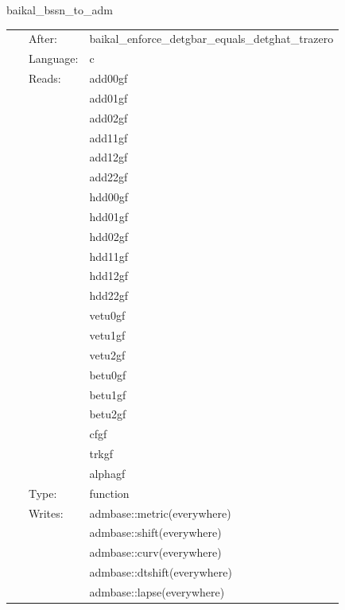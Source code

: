 \vspace{5mm}


\hspace{5mm} baikal\_bssn\_to\_adm 

\hspace{5mm}{\it perform bssn-to-adm conversion in mol\_pseudoevolution. needed for proper hydrobase integration. } 


\hspace{5mm}

 \begin{tabular*}{160mm}{cll} 
~ & After:  & baikal\_enforce\_detgbar\_equals\_detghat\_trazero \\ 
~ & Language:  & c \\ 
~ & Reads:  & add00gf \\ 
~& ~ &add01gf\\ 
~& ~ &add02gf\\ 
~& ~ &add11gf\\ 
~& ~ &add12gf\\ 
~& ~ &add22gf\\ 
~& ~ &hdd00gf\\ 
~& ~ &hdd01gf\\ 
~& ~ &hdd02gf\\ 
~& ~ &hdd11gf\\ 
~& ~ &hdd12gf\\ 
~& ~ &hdd22gf\\ 
~& ~ &vetu0gf\\ 
~& ~ &vetu1gf\\ 
~& ~ &vetu2gf\\ 
~& ~ &betu0gf\\ 
~& ~ &betu1gf\\ 
~& ~ &betu2gf\\ 
~& ~ &cfgf\\ 
~& ~ &trkgf\\ 
~& ~ &alphagf\\ 
~ & Type:  & function \\ 
~ & Writes:  & admbase::metric(everywhere) \\ 
~& ~ &admbase::shift(everywhere)\\ 
~& ~ &admbase::curv(everywhere)\\ 
~& ~ &admbase::dtshift(everywhere)\\ 
~& ~ &admbase::lapse(everywhere)\\ 
\end{tabular*} 


\vspace{5mm}

